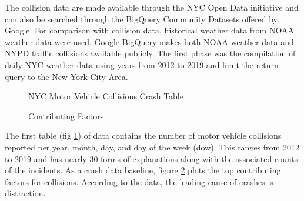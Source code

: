 \documentclass[conference]{IEEEtran}
\begin{document}
The collision data are made available through the NYC Open Data initiative and can also be searched through the BigQuery Community Datasets offered by Google. For comparison with collision data, historical weather data from NOAA weather data were used.  Google BigQuery makes both NOAA weather data and NYPD traffic collisions available publicly. The first phase was the compilation of daily NYC weather data using years from 2012 to 2019 and limit the return query to the New York City Area. 
\begin{figure}[bth]
	\centering
	\caption{NYC Motor Vehicle Collisions Crash Table}
	\label{fig:mvtable}
\end{figure}
\begin{figure}[bth]
	\centering
	\caption{Contributing Factors}
	\label{fig:crashPlot}
\end{figure}
The first table (fig \ref{fig:mvtable}) of data contains the number of motor vehicle collisions reported per year, month, day, and day of the week (dow). This ranges from 2012 to 2019 and has nearly 30 forms of explanations along with the associated counts of the incidents.  As a crash data baseline, figure \ref{fig:crashPlot} plots the top contributing factors for collisions. According to the data, the leading cause of crashes is distraction. 
\end{document}

